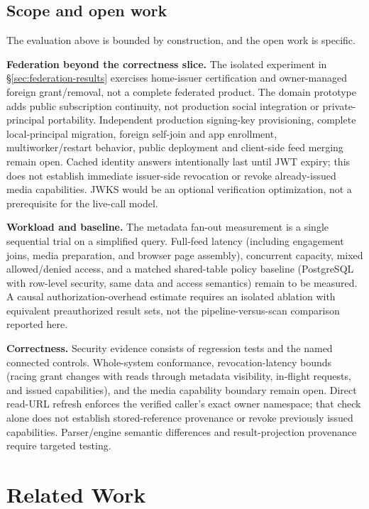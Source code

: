 \documentclass[sigconf, nonacm]{acmart}
\begin{document}
\subsection{Scope and open work}
\label{sec:limits}

The evaluation above is bounded by construction, and the open work is
specific.

\textbf{Federation beyond the correctness slice.} The isolated experiment in
\S\ref{sec:federation-results} exercises home-issuer certification and
owner-managed foreign grant/removal, not a complete federated product. The
domain prototype adds public subscription continuity, not production social
integration or private-principal portability. Independent production
signing-key provisioning, complete local-principal migration, foreign
self-join and app enrollment, multiworker/restart behavior, public deployment
and client-side feed merging remain open. Cached identity answers
intentionally last until JWT expiry; this does not establish immediate
issuer-side revocation or revoke already-issued media capabilities. JWKS
would be an optional verification optimization, not a prerequisite for the
live-call model.

\textbf{Workload and baseline.} The metadata fan-out measurement is a single
sequential trial on a simplified query. Full-feed latency (including
engagement joins, media preparation, and browser page assembly), concurrent
capacity, mixed allowed/denied access, and a matched shared-table policy
baseline (PostgreSQL with row-level security, same data and access
semantics) remain to be measured. A causal authorization-overhead estimate
requires an isolated ablation with equivalent preauthorized result sets, not
the pipeline-versus-scan comparison reported here.

\textbf{Correctness.} Security evidence consists of regression tests and the
named connected controls. Whole-system conformance, revocation-latency bounds
(racing grant changes with reads through metadata visibility, in-flight
requests, and issued capabilities), and the media capability boundary remain
open. Direct read-URL refresh enforces the verified caller's exact owner
namespace; that check alone does not establish stored-reference provenance or
revoke previously issued capabilities. Parser/engine semantic differences and
result-projection provenance require targeted testing.

\section{Related Work}
\label{sec:related}
\end{document}
